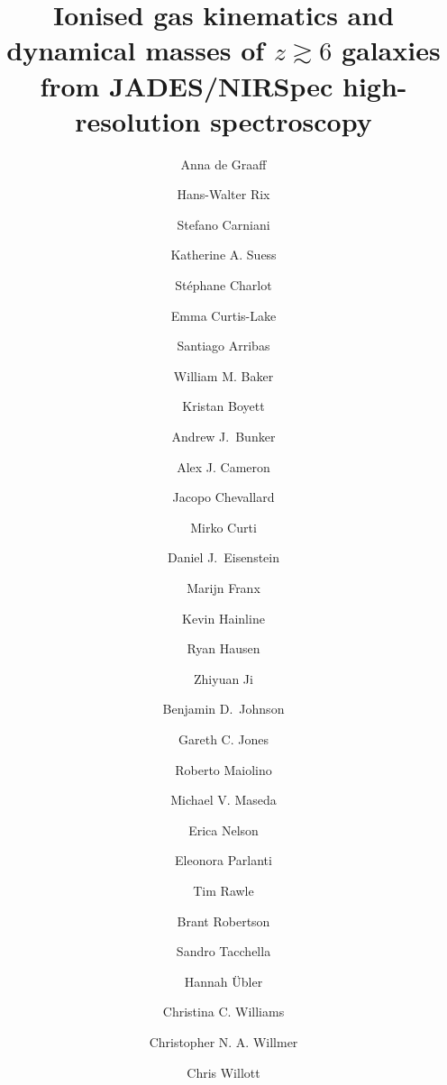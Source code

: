 \documentclass[longauth]{aa}
\begin{document}
   \title{Ionised gas kinematics and dynamical masses of $z\gtrsim6$ galaxies from JADES/NIRSpec high-resolution spectroscopy
   }



   \author{Anna de Graaff
          \and  Hans-Walter Rix\inst{\ref{i1}}
          \and Stefano Carniani\inst{\ref{i3}}
          \and Katherine A. Suess\inst{\ref{i14},\ref{i18}}
          \and St\'ephane Charlot\inst{\ref{i5}}
          \and Emma Curtis-Lake\inst{\ref{i2}}
          \and Santiago Arribas \inst{\ref{i10}}
          \and William M. Baker\inst{\ref{i6},\ref{i7}} 
          \and Kristan Boyett\inst{\ref{i20},\ref{i21}}
          \and Andrew J.\ Bunker\inst{\ref{i4}}
          \and Alex J. Cameron\inst{\ref{i4}}
          \and Jacopo Chevallard\inst{\ref{i4}}
          \and Mirko Curti\inst{\ref{i23},\ref{i6},\ref{i7}}
          \and Daniel J.\ Eisenstein\inst{\ref{i13}}
          \and Marijn Franx\inst{\ref{i19}}
          \and Kevin Hainline\inst{\ref{i16}}
          \and Ryan Hausen\inst{\ref{i22}}
          \and Zhiyuan Ji\inst{\ref{i16}} 
          \and Benjamin D.\ Johnson\inst{\ref{i13}}
          \and Gareth C. Jones\inst{\ref{i4}}
          \and Roberto Maiolino\inst{\ref{i6},\ref{i7},\ref{i8}}
          \and Michael V. Maseda\inst{\ref{i11}}
          \and Erica Nelson\inst{\ref{i17}} 
          \and Eleonora Parlanti\inst{\ref{i3}} 
          \and Tim Rawle\inst{\ref{i12}}
          \and Brant Robertson\inst{\ref{i14}}
          \and Sandro Tacchella\inst{\ref{i6},\ref{i7}}
          \and Hannah \"Ubler\inst{\ref{i6},\ref{i7}}
          \and Christina C. Williams\inst{\ref{i15}}
          \and Christopher N. A. Willmer\inst{\ref{i16}} 
          \and Chris Willott\inst{\ref{i9}}
          }
\end{document}
